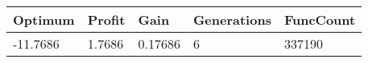 \begin{tabular}{lllll}
Optimum & Profit & Gain & Generations & FuncCount \\ 
\hline 
-11.7686 & 1.7686 & 0.17686 & 6 & 337190 \\ 
\hline 
\end{tabular}